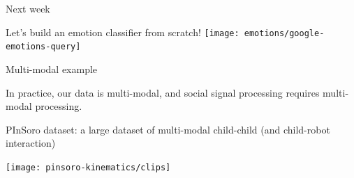 \documentclass[compress]{beamer}
\begin{document}
\begin{frame}{Next week}
    \begin{center}
        \Large
        Let's build an emotion classifier from scratch!
        \vspace{2cm}
        \texttt{[image: emotions/google-emotions-query]}
    \end{center}
\end{frame}



{

\begin{frame}{Multi-modal example}

    In practice, our data is multi-modal, and social signal processing requires multi-modal processing.

    PInSoro dataset: a large dataset of multi-modal child-child (and child-robot
    interaction)

    \begin{center}
        \texttt{[image: pinsoro-kinematics/clips]}
    \end{center}

\end{frame}
}




\end{document}
